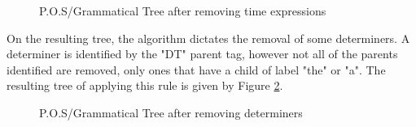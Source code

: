 \begin{figure}[h]
\caption{P.O.S/Grammatical Tree after removing time expressions}
\label{tree:removeTime}
\end{figure}
\par On the resulting tree, the algorithm dictates the removal of some determiners. A determiner is identified by the "DT" parent tag, however not all of the parents identified are removed, only ones that have a child of label "the" or "a". The resulting tree of applying this rule is given by Figure \ref{tree:removeDeterminers}.
\begin{figure}[h]
\caption{P.O.S/Grammatical Tree after removing determiners}
\label{tree:removeDeterminers}
\end{figure}
